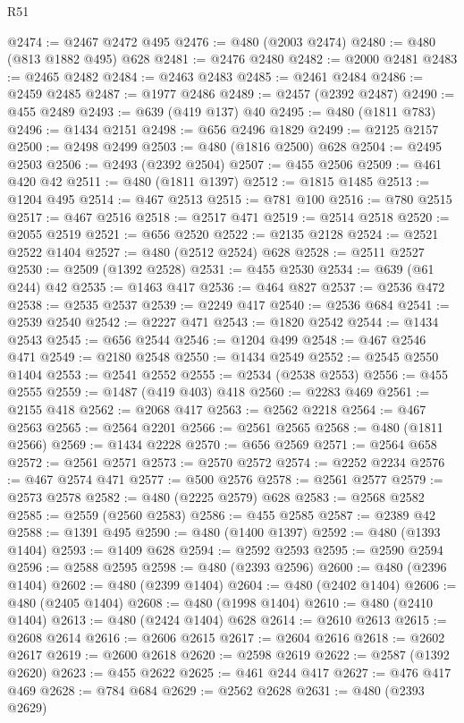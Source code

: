 \begin{lexlean}{R51}
\begin{coremodule}
@2474 := @2467 @2472 @495
@2476 := @480 (@2003 @2474)
@2480 := @480 (@813 @1882 @495) @628
@2481 := @2476 @2480
@2482 := @2000 @2481
@2483 := @2465 @2482
@2484 := @2463 @2483
@2485 := @2461 @2484
@2486 := @2459 @2485
@2487 := @1977 @2486
@2489 := @2457 (@2392 @2487)
@2490 := @455 @2489
@2493 := @639 (@419 @137) @40
@2495 := @480 (@1811 @783)
@2496 := @1434 @2151
@2498 := @656 @2496 @1829
@2499 := @2125 @2157
@2500 := @2498 @2499
@2503 := @480 (@1816 @2500) @628
@2504 := @2495 @2503
@2506 := @2493 (@2392 @2504)
@2507 := @455 @2506
@2509 := @461 @420 @42
@2511 := @480 (@1811 @1397)
@2512 := @1815 @1485
@2513 := @1204 @495
@2514 := @467 @2513
@2515 := @781 @100
@2516 := @780 @2515
@2517 := @467 @2516
@2518 := @2517 @471
@2519 := @2514 @2518
@2520 := @2055 @2519
@2521 := @656 @2520
@2522 := @2135 @2128
@2524 := @2521 @2522 @1404
@2527 := @480 (@2512 @2524) @628
@2528 := @2511 @2527
@2530 := @2509 (@1392 @2528)
@2531 := @455 @2530
@2534 := @639 (@61 @244) @42
@2535 := @1463 @417
@2536 := @464 @827
@2537 := @2536 @472
@2538 := @2535 @2537
@2539 := @2249 @417
@2540 := @2536 @684
@2541 := @2539 @2540
@2542 := @2227 @471
@2543 := @1820 @2542
@2544 := @1434 @2543
@2545 := @656 @2544
@2546 := @1204 @499
@2548 := @467 @2546 @471
@2549 := @2180 @2548
@2550 := @1434 @2549
@2552 := @2545 @2550 @1404
@2553 := @2541 @2552
@2555 := @2534 (@2538 @2553)
@2556 := @455 @2555
@2559 := @1487 (@419 @403) @418
@2560 := @2283 @469
@2561 := @2155 @418
@2562 := @2068 @417
@2563 := @2562 @2218
@2564 := @467 @2563
@2565 := @2564 @2201
@2566 := @2561 @2565
@2568 := @480 (@1811 @2566)
@2569 := @1434 @2228
@2570 := @656 @2569
@2571 := @2564 @658
@2572 := @2561 @2571
@2573 := @2570 @2572
@2574 := @2252 @2234
@2576 := @467 @2574 @471
@2577 := @500 @2576
@2578 := @2561 @2577
@2579 := @2573 @2578
@2582 := @480 (@2225 @2579) @628
@2583 := @2568 @2582
@2585 := @2559 (@2560 @2583)
@2586 := @455 @2585
@2587 := @2389 @42
@2588 := @1391 @495
@2590 := @480 (@1400 @1397)
@2592 := @480 (@1393 @1404)
@2593 := @1409 @628
@2594 := @2592 @2593
@2595 := @2590 @2594
@2596 := @2588 @2595
@2598 := @480 (@2393 @2596)
@2600 := @480 (@2396 @1404)
@2602 := @480 (@2399 @1404)
@2604 := @480 (@2402 @1404)
@2606 := @480 (@2405 @1404)
@2608 := @480 (@1998 @1404)
@2610 := @480 (@2410 @1404)
@2613 := @480 (@2424 @1404) @628
@2614 := @2610 @2613
@2615 := @2608 @2614
@2616 := @2606 @2615
@2617 := @2604 @2616
@2618 := @2602 @2617
@2619 := @2600 @2618
@2620 := @2598 @2619
@2622 := @2587 (@1392 @2620)
@2623 := @455 @2622
@2625 := @461 @244 @417
@2627 := @476 @417 @469
@2628 := @784 @684
@2629 := @2562 @2628
@2631 := @480 (@2393 @2629)

\end{coremodule}
\end{lexlean}
